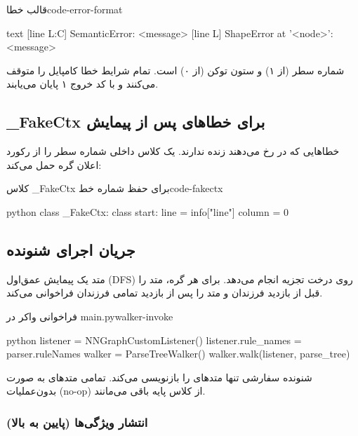 \documentclass{nngraph-fa}
\begin{document}
\begin{codebox}{قالب خطا}{code-error-format}
\begin{amzcode}{text}
[line L:C] SemanticError: <message>
[line L] ShapeError at '<node>': <message>
\end{amzcode}
\end{codebox}

 شماره سطر (از ۱) و  ستون توکن (از ۰) است.
تمام شرایط خطا کامپایل را متوقف می‌کنند و با کد خروج ۱ پایان
می‌یابند.

\subsection{\_FakeCtx برای خطاهای پس از پیمایش}

خطاهایی که در  رخ می‌دهند  زنده
ندارند. یک کلاس داخلی  شماره سطر را از رکورد
اعلان گره حمل می‌کند:

\begin{codebox}{کلاس \_FakeCtx برای حفظ شماره خط}{code-fakectx}
\begin{amzcode}{python}
class _FakeCtx:
    class start:
        line   = info["line"]
        column = 0
\end{amzcode}
\end{codebox}
\subsection{جریان اجرای شنونده}

متد  یک پیمایش عمق‌اول (DFS) روی درخت تجزیه انجام می‌دهد. برای هر گره، متد  را قبل از بازدید فرزندان و متد  را پس از بازدید تمامی فرزندان فراخوانی می‌کند.

\begin{dfnbox}{فراخوانی واکر در main.py}{walker-invoke}
\begin{amzcode}{python}
listener = NNGraphCustomListener()
listener.rule_names = parser.ruleNames
walker = ParseTreeWalker()
walker.walk(listener, parse_tree)
\end{amzcode}
\end{dfnbox}

شنونده سفارشی تنها متدهای  را بازنویسی می‌کند. تمامی متدهای  به صورت بدون‌عملیات (no-op) از کلاس پایه  باقی می‌مانند.

\subsubsection{انتشار ویژگی‌ها (پایین به بالا)}
\end{document}
